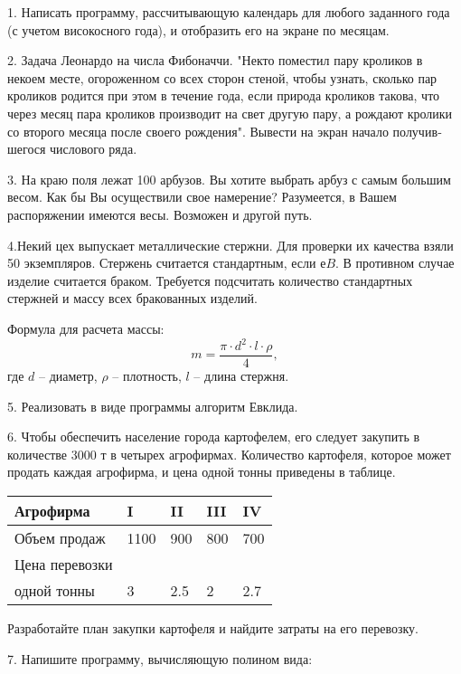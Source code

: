{1. Написать программу, рассчитывающую календарь для любого заданного года (с учетом високосного года), и отобразить его на экране по месяцам.

2. Задача Леонардо на числа Фибоначчи. "Некто поместил пару кроликов в некоем месте, огороженном со всех сторон стеной, чтобы узнать, сколько пар кроликов родится при этом в течение года, если природа кроликов такова, что через месяц пара кроликов производит на свет другую пару, а рождают кролики со второго месяца после своего рождения". Вывести на экран начало получив­шегося числового ряда.

3. На краю поля лежат 100 арбузов. Вы хотите выбрать арбуз с самым большим весом. Как бы Вы осуществили свое намерение? Разумеется, в Вашем распоряжении имеются весы. Возможен и другой путь.
    
4.Некий цех выпускает металлические стержни. Для проверки их качества взяли 50 экземпляров. Стержень считается стандартным, если е$B$. В противном случае изделие считается браком. Требуется подсчитать количест­во стандартных стержней и массу всех бракованных изделий.

Формула для расчета массы:   $$m = \frac{\pi\cdot d^2\cdot l\cdot \rho}{4}, $$
где $d$ -- диаметр, $\rho$ -- плотность,   $l$ -- длина стержня.

5. Реализовать в виде программы алгоритм Евклида.

6. Чтобы обеспечить население города картофелем, его следу­ет закупить в количестве 3000 т в четырех агрофирмах. Количест­во картофеля, которое может продать каждая агрофирма, и цена одной тонны приведены в таблице.

\begin{center}
\begin{tabular}{ | l | l | l |  l |  l |} \hline
Агрофирма & I  &  II  &  III  &  IV   \\   \hline
Объем продаж & 1100  &  900  &  800  &  700   \\   \hline
Цена перевозки &    &     &     &      \\   
одной тонны & 3  &  2.5  &  2  &  2.7     \\   \hline
\end{tabular}
\end{center}
\vspace{5mm}

Разработайте план закупки картофеля и найдите затраты на его перевозку.

7. Напишите программу, вычисляющую полином вида:

}
